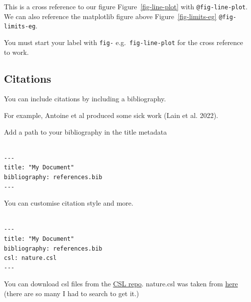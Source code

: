 \documentclass[
  letterpaper,
  DIV=11,
  numbers=noendperiod,
  oneside]{scrartcl}
\begin{document}
This is a cross reference to our figure Figure~\ref{fig-line-plot} with
\texttt{@fig-line-plot}. We can also reference the matplotlib figure
above Figure~\ref{fig-limits-eg} \texttt{@fig-limits-eg}.

\begin{tcolorbox}[enhanced jigsaw, opacitybacktitle=0.6, toprule=.15mm, arc=.35mm, opacityback=0, bottomrule=.15mm, coltitle=black, colbacktitle=quarto-callout-note-color!10!white, breakable, title=\textcolor{quarto-callout-note-color}{\faInfo}\hspace{0.5em}{Note}, colframe=quarto-callout-note-color-frame, left=2mm, colback=white, leftrule=.75mm, bottomtitle=1mm, toptitle=1mm, titlerule=0mm, rightrule=.15mm]

You must start your label with \texttt{fig-} e.g.~\texttt{fig-line-plot}
for the cross reference to work.

\end{tcolorbox}

\hypertarget{citations}{%
\subsection{Citations}\label{citations}}

You can include citations by including a bibliography.

For example, Antoine et al produced some sick work (Lain et al. 2022).

Add a path to your bibliography in the title metadata

\begin{verbatim}

---
title: "My Document"
bibliography: references.bib
---
\end{verbatim}

You can customise citation style and more.

\begin{verbatim}

---
title: "My Document"
bibliography: references.bib
csl: nature.csl
---
\end{verbatim}

\begin{tcolorbox}[enhanced jigsaw, opacitybacktitle=0.6, toprule=.15mm, arc=.35mm, opacityback=0, bottomrule=.15mm, coltitle=black, colbacktitle=quarto-callout-note-color!10!white, breakable, title=\textcolor{quarto-callout-note-color}{\faInfo}\hspace{0.5em}{Note}, colframe=quarto-callout-note-color-frame, left=2mm, colback=white, leftrule=.75mm, bottomtitle=1mm, toptitle=1mm, titlerule=0mm, rightrule=.15mm]

You can download csl files from the
\href{https://github.com/citation-style-language/styles}{CSL repo}.
nature.csl was taken from
\href{https://github.com/citation-style-language/styles/blob/master/nature.csl}{here}
(there are so many I had to search to get it.)

\end{tcolorbox}
\end{document}
